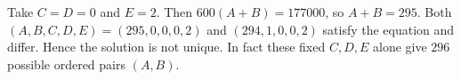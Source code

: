 Take $C=D=0$ and $E=2$. Then $600(A+B)=177000$, so $A+B=295$. Both $(A,B,C,D,E)=(295,0,0,0,2)$ and $(294,1,0,0,2)$ satisfy the equation and differ. Hence the solution is not unique. In fact these fixed $C,D,E$ alone give $296$ possible ordered pairs $(A,B)$.

